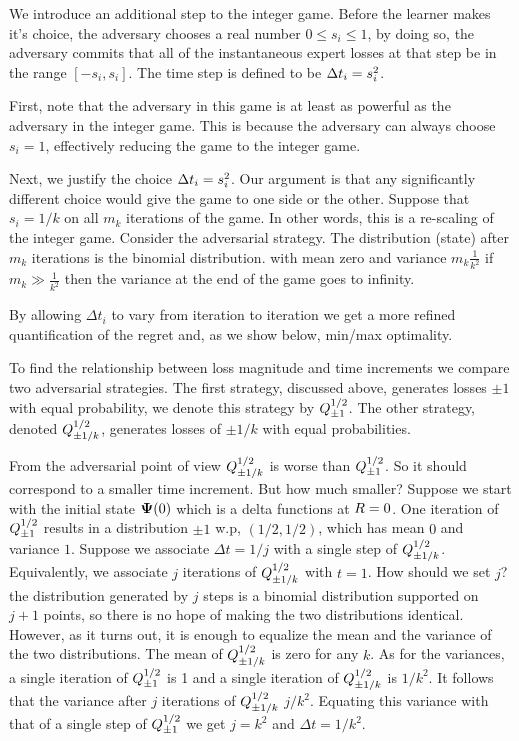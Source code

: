 \documentclass[12pt]{article} %
\begin{document}
We introduce an additional step to the integer game. Before the
learner makes it's choice, the 
adversary chooses a real number $0 \leq s_i \leq 1$, by doing so, the
adversary commits that all of the instantaneous expert losses at that
step be in the range $[-s_i,s_i]$. The time step is defined to be $\Delta t_i =
s_i^2$.

First, note that the adversary in this game is at least as powerful as
the adversary in the integer game. This is because the adversary can
always choose $s_i=1$, effectively reducing the game to the integer
game.

Next, we justify the choice $\Delta t_i = s_i^2$. Our argument is that
any significantly different choice would give the game to one side or
the other.  Suppose that $s_i = 1/k$ on all $m_k$ iterations of the game. In
other words, this is a re-scaling of the integer game. Consider the
adversarial strategy. The distribution (state) after $m_k$ iterations is the
binomial distribution. with mean zero and variance $m_k \frac{1}{k^2}$
if $m_k \gg \frac{1}{k^2}$ then the variance at the end of the game
goes to infinity.

\iffalse
The state after $m_k$ iterations is the
binomial dist
\begin{equation}
  \score^{m(k)} = \frac{1}{2^m} \sum_{i=-m}^m {2m+1 \choose i+m} \pot(m,i/k)
\end{equation}
if $m/\deltat_i $
\fi

By allowing $\Delta t_i$ to vary from iteration to iteration
we get a more refined quantification of the regret and, as we show
below, min/max optimality.

To find the relationship between loss magnitude and time increments 
we compare two adversarial strategies.  The first strategy, discussed above,
generates losses $\pm 1$ with equal probability, we denote this
strategy by $Q^{1/2}_{\pm 1}$. The other strategy, denoted
$Q^{1/2}_{\pm 1/k}$, generates losses of $\pm 1/k$ with equal
probabilities.

From the adversarial point of view $Q^{1/2}_{\pm 1/k}$ is worse
than $Q^{1/2}_{\pm 1}$. So it should correspond to a smaller
time increment. But how much smaller? Suppose we start with the
initial state ${\bf \Psi}(0)$ which is a delta functions at $R=0$.  One
iteration of $Q^{1/2}_{\pm 1}$ results in a distribution
$\pm 1$ w.p, $(1/2,1/2)$, which has mean $0$ and variance $1$.
Suppose we associate $\Delta t =1/j$ with a single step of
$Q^{1/2}_{\pm 1/k}$.  Equivalently, we associate $j$ iterations
of $Q^{1/2}_{\pm 1/k}$ with $t=1$.  How should we set $j$? the
distribution generated by $j$ steps is a binomial distribution
supported on $j+1$ points, so there is no hope of making the two
distributions identical. However, as it turns out, it is enough to
equalize the mean and the variance of the two distributions. The mean
of $Q^{1/2}_{\pm 1/k}$ is zero for any $k$. As for the
variances, a single iteration of $Q^{1/2}_{\pm 1}$ is 1 and a
single iteration of $Q^{1/2}_{\pm 1/k}$ is $1/k^2$. It follows
that the variance after $j$ iterations of $Q^{1/2}_{\pm 1/k}$
$j/k^2$. Equating this variance with that of a single step of
$Q^{1/2}_{\pm 1}$ we get $j=k^2$ and $\Delta t= 1/k^2$.
\end{document}
